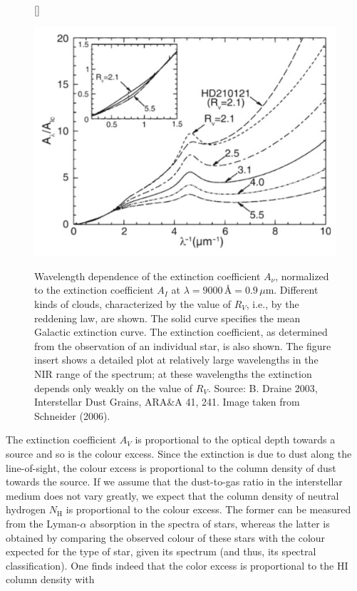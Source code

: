 \documentclass[a4paper,10pt]{article}
\begin{document}
\begin{figure}[h]
    [\FBwidth]
    {\caption{\footnotesize{Wavelength dependence of the extinction coefficient $A_\nu$, normalized to the extinction coefficient $A_I$ at $\lambda=9000$\,\AA$ = 0.9\,\mu$m. Different kinds of clouds, characterized by the value of $R_V$, i.e., by the reddening law, are shown. The solid curve specifies the mean Galactic extinction curve. The extinction coefficient, as determined from the observation of an individual star, is also shown. The figure insert shows a detailed plot at relatively large wavelengths in the NIR range of the spectrum; at these wavelengths the extinction depends only weakly on the value of $R_V$. Source: B. Draine 2003, Interstellar Dust Grains, ARA\&A 41, 241. Image taken from Schneider (2006).}}
    \label{fig:extinctioncurve}}
    {\includegraphics[width=12cm]{figures/ExtinctionCurve.png}}
\end{figure}

{\noindent}The extinction coefficient $A_V$ is proportional to the optical depth towards a source and so is the colour excess. Since the extinction is due to dust along the line-of-sight, the colour excess is proportional to the column density of dust towards the source. If we assume that the dust-to-gas ratio in the interstellar medium does not vary greatly, we expect that the column density of neutral hydrogen $N_\mathrm{H}$ is proportional to the colour excess. The former can be measured from the Lyman-$\alpha$ absorption in the spectra of stars, whereas the latter is obtained by comparing the observed colour of these stars with the colour expected for the type of star, given its spectrum (and thus, its spectral classification). One finds indeed that the color excess is proportional to the HI column density with
\end{document}
